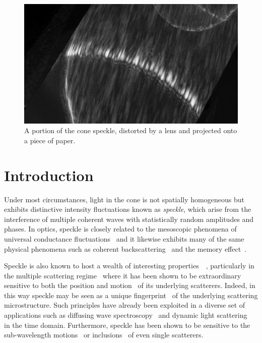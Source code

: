 \begin{figure}[ht]
\centering
\includegraphics[keepaspectratio,width=15cm]{speckle/figures/Ag_LaSFN9_cone_lens11_cam-8899.jpg}
\caption{A portion of the cone speckle, distorted by a lens and projected onto a piece of paper.}
\label{fig:examplespeckle}
\end{figure}
\section{Introduction}

Under most circumstances, light in the cone is not spatially homogeneous but
exhibits distinctive intensity fluctuations known as \textit{speckle}, which
arise from the interference of multiple coherent waves with statistically
random amplitudes and phases.  In optics, speckle is closely related to the
mesoscopic phenomena of universal conductance
fluctuations~\cite{lee1985universal} and it likewise exhibits many of the same
physical phenomena such as coherent
backscattering~\cite{akkermans1986coherent} and the memory
effect~\cite{freund1988memory}.

Speckle is also known to host a wealth of interesting
properties~\cite{goodman1975statistical}~\cite{freund19981001}, particularly
in the multiple scattering regime~\cite{feng1986sensitivity} where it has been
shown to be extraordinary sensitive to both the position and
motion~\cite{berkovits1994correlations} of its underlying scatterers.  Indeed,
in this way speckle may be seen as a unique
fingerprint~\cite{ravikanth2001physical} of the underlying scattering
microstructure.  Such principles have already been exploited in a diverse set
of applications such as diffusing wave spectroscopy~\cite{pine1988diffusing}
and dynamic light scattering~\cite{berne2000dynamic} in the time domain.
Furthermore, speckle has been shown to be sensitive to the sub-wavelength
motions~\cite{berkovits1991sensitivity} or
inclusions~\cite{berkovits1990theory} of even single scatterers.

